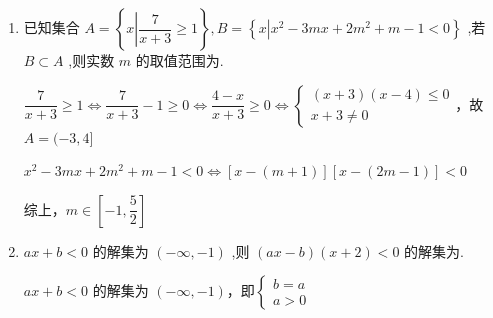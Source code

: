 \begin{enumerate}
\begin{jieda}
        由题意可得得 $\left(- \dfrac{1}{2}, 1\right) \subset (m, m + 2)$ 包含 $- \dfrac{1}{2} < x < 1$，故 $m \in  \left\lbrack  {-1, - \dfrac{1}{2}}\right\rbrack$
    \end{jieda}
    \item  已知集合 $A = \left\{  {x\left| {\dfrac{7}{x + 3} \geq  1}\right. }\right\}  ,B = \left\{  {x\left| {{x}^{2} - {3mx} + 2{m}^{2} + m - 1 < 0}\right. }\right\}$ ,若 $B \subset  A$ ,则实数 $m$ 的取值范围为.
    \begin{jieda}
        $\dfrac{7}{x + 3} \geq  1 \Longleftrightarrow \dfrac{7}{x + 3} - 1 \geq  0 \Longleftrightarrow \dfrac{4 - x}{x + 3} \geq  0 \Longleftrightarrow \left\{  \begin{array}{l} \left( {x + 3}\right) \left( {x - 4}\right)  \leq  0 \\  x + 3 \neq  0 \end{array}\right.$，故$A = ( - 3,4\rbrack$
        
        ${x}^{2} - {3mx} + 2{m}^{2} + m - 1 < 0 \Longleftrightarrow \left\lbrack  {x - \left( {m + 1}\right) }\right\rbrack  \left\lbrack  {x - \left( {{2m} - 1}\right) }\right\rbrack  < 0$

        综上，$m \in \left\lbrack  {-1,\dfrac{5}{2}}\right\rbrack$
    \end{jieda}
    \item ${ax} + b < 0$ 的解集为 $\left( {-\infty , - 1}\right)$ ,则 $\left( {{ax} - b}\right) \left( {x + 2}\right)  < 0$ 的解集为.
    \begin{jieda}
         ${ax} + b < 0$ 的解集为 $\left( {-\infty , - 1}\right)$，即$\left\{\begin{array}{l}
              b = a  \\
              a > 0
         \end{array}\right.$


\end{jieda}
\end{enumerate}
